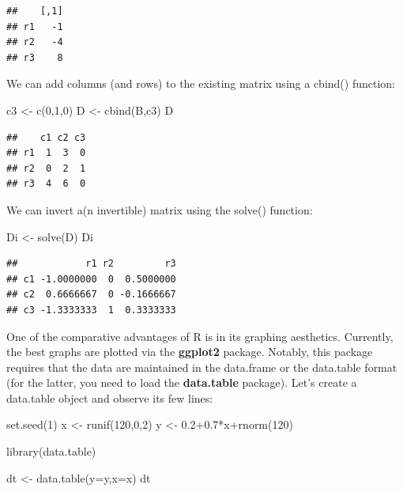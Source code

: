 \documentclass[
  12pt,
  oneside]{book}
\newenvironment{Shaded}{\begin{snugshade}}{\end{snugshade}}
\newcommand{\AttributeTok}[1]{\textcolor[rgb]{0.77,0.63,0.00}{#1}}
\newcommand{\DecValTok}[1]{\textcolor[rgb]{0.00,0.00,0.81}{#1}}
\newcommand{\FloatTok}[1]{\textcolor[rgb]{0.00,0.00,0.81}{#1}}
\newcommand{\FunctionTok}[1]{\textcolor[rgb]{0.00,0.00,0.00}{#1}}
\newcommand{\NormalTok}[1]{#1}
\newcommand{\OtherTok}[1]{\textcolor[rgb]{0.56,0.35,0.01}{#1}}
\newcommand{\SpecialCharTok}[1]{\textcolor[rgb]{0.00,0.00,0.00}{#1}}
\begin{document}
\begin{verbatim}
##    [,1]
## r1   -1
## r2   -4
## r3    8
\end{verbatim}

We can add columns (and rows) to the existing matrix using a cbind() function:

\begin{Shaded}
\begin{Highlighting}[]
\NormalTok{c3 }\OtherTok{\textless{}{-}} \FunctionTok{c}\NormalTok{(}\DecValTok{0}\NormalTok{,}\DecValTok{1}\NormalTok{,}\DecValTok{0}\NormalTok{)}
\NormalTok{D }\OtherTok{\textless{}{-}} \FunctionTok{cbind}\NormalTok{(B,c3)}
\NormalTok{D}
\end{Highlighting}
\end{Shaded}

\begin{verbatim}
##    c1 c2 c3
## r1  1  3  0
## r2  0  2  1
## r3  4  6  0
\end{verbatim}

We can invert a(n invertible) matrix using the solve() function:

\begin{Shaded}
\begin{Highlighting}[]
\NormalTok{Di }\OtherTok{\textless{}{-}} \FunctionTok{solve}\NormalTok{(D)}
\NormalTok{Di}
\end{Highlighting}
\end{Shaded}

\begin{verbatim}
##            r1 r2         r3
## c1 -1.0000000  0  0.5000000
## c2  0.6666667  0 -0.1666667
## c3 -1.3333333  1  0.3333333
\end{verbatim}

One of the comparative advantages of R is in its graphing aesthetics. Currently, the best graphs are plotted via the \textbf{ggplot2} package. Notably, this package requires that the data are maintained in the data.frame or the data.table format (for the latter, you need to load the \textbf{data.table} package). Let's create a data.table object and observe its few lines:

\begin{Shaded}
\begin{Highlighting}[]
\FunctionTok{set.seed}\NormalTok{(}\DecValTok{1}\NormalTok{)}
\NormalTok{x }\OtherTok{\textless{}{-}} \FunctionTok{runif}\NormalTok{(}\DecValTok{120}\NormalTok{,}\DecValTok{0}\NormalTok{,}\DecValTok{2}\NormalTok{)}
\NormalTok{y }\OtherTok{\textless{}{-}} \FloatTok{0.2+0.7}\SpecialCharTok{*}\NormalTok{x}\SpecialCharTok{+}\FunctionTok{rnorm}\NormalTok{(}\DecValTok{120}\NormalTok{)}

\FunctionTok{library}\NormalTok{(data.table)}

\NormalTok{dt }\OtherTok{\textless{}{-}} \FunctionTok{data.table}\NormalTok{(}\AttributeTok{y=}\NormalTok{y,}\AttributeTok{x=}\NormalTok{x)}
\NormalTok{dt}
\end{Highlighting}
\end{Shaded}
\end{document}
